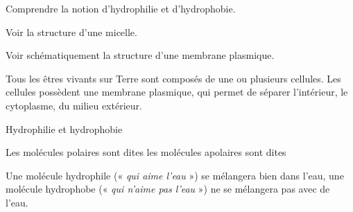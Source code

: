 \tetePremStssBiom
\vspace*{-30pt}

\begin{objectifs}
  \item Comprendre la notion d'hydrophilie et d'hydrophobie.
  \item Voir la structure d'une micelle.
  \item Voir schématiquement la structure d'une membrane plasmique.
\end{objectifs}

\begin{contexte}
  Tous les êtres vivants sur Terre sont composés de une ou plusieurs cellules.
  Les cellules possèdent une membrane plasmique, qui permet de séparer l'intérieur, le cytoplasme, du milieu extérieur.
  
\end{contexte}


\begin{doc}{Hydrophilie et hydrophobie}
  \begin{importants}
    Les molécules polaires sont dites  les molécules apolaires sont dites 
  \end{importants}
  Une molécule hydrophile («\textit{ qui aime l'eau} ») se mélangera bien dans l'eau, une molécule hydrophobe (« \textit{qui n'aime pas l'eau} ») ne se mélangera pas avec de l'eau.
\end{doc}


